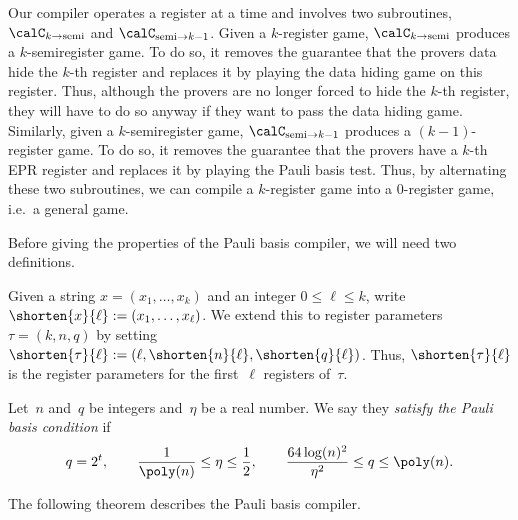 Our compiler operates a register at a time and involves two subroutines, $\calC_{k \rightarrow \mathrm{semi}}$ and $\calC_{\mathrm{semi}\rightarrow k-1}$.
Given a $k$-register game, $\calC_{k\rightarrow \mathrm{semi}}$ produces a $k$-semiregister game.
To do so, it removes the guarantee that the provers data hide the $k$-th register and replaces it by playing the data hiding game on this register.
Thus, although the provers are no longer forced to hide the $k$-th register, they will have to do so anyway if they want to pass the data hiding game.
Similarly, given a $k$-semiregister game, $\calC_{\mathrm{semi}\rightarrow k-1}$ produces a $(k-1)$-register game.
To do so, it removes the guarantee that the provers have a $k$-th EPR register and replaces it by playing the Pauli basis test.
Thus, by alternating these two subroutines, we can compile a $k$-register game into a $0$-register game, i.e.\ a general game.


Before giving the properties of the Pauli basis compiler, we will need two definitions.

\begin{definition}
Given a string $x = (x_1, \ldots, x_k)$ and an integer $0 \leq \ell \leq k$, write $\shorten{x}{\ell} := (x_1, \ldots, x_\ell)$.
We extend this to register parameters $\tau = (k, n, q)$ by setting 
$\shorten{\tau}{\ell} := (\ell, \shorten{n}{\ell}, \shorten{q}{\ell})$.
Thus, $\shorten{\tau}{\ell}$ is the register parameters for the first~$\ell$ registers of~$\tau$.
\end{definition}

\begin{definition}
Let~$n$ and~$q$ be integers and~$\eta$ be a real number. We say they \emph{satisfy the Pauli basis condition} if
\begin{equation*}
q = 2^t,\qquad
\frac{1}{\mathrm{\poly}(n)} \leq \eta \leq \frac{1}{2},
\qquad \frac{64 \log(n)^2}{\eta^2} \leq q \leq \poly(n).
\end{equation*}
\end{definition}

The following theorem describes the Pauli basis compiler.

